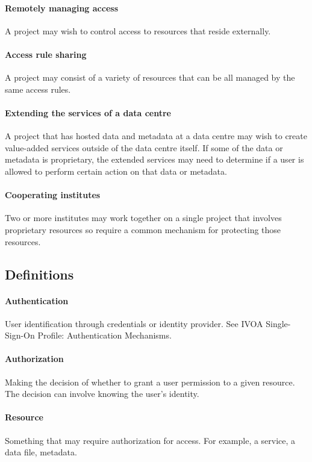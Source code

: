 \documentclass[11pt,a4paper]{ivoa}
\begin{document}
\paragraph{Remotely managing access} A project may wish to control access to resources that reside externally.

\paragraph{Access rule sharing} A project may consist of a variety of resources that can be all managed by the same access rules.

\paragraph{Extending the services of a data centre} A project that has hosted data and metadata at a data centre may wish to create value-added services outside of the data centre itself.  If some of the data or metadata is proprietary, the extended services may need to determine if a user is allowed to perform certain action on that data or metadata.

\paragraph{Cooperating institutes} Two or more institutes may work together on a single project that involves proprietary resources so require a common mechanism for protecting those resources.

\subsection{Definitions}

\paragraph{Authentication} User identification through credentials or identity provider.  See IVOA Single-Sign-On Profile: Authentication Mechanisms.  \citep{std:SSOAUTH}

\paragraph{Authorization} Making the decision of whether to grant a user permission to a given resource.  The decision can involve knowing the user's identity.

\paragraph{Resource} Something that may require authorization for access.  For example, a service, a data file, metadata.
\end{document}

